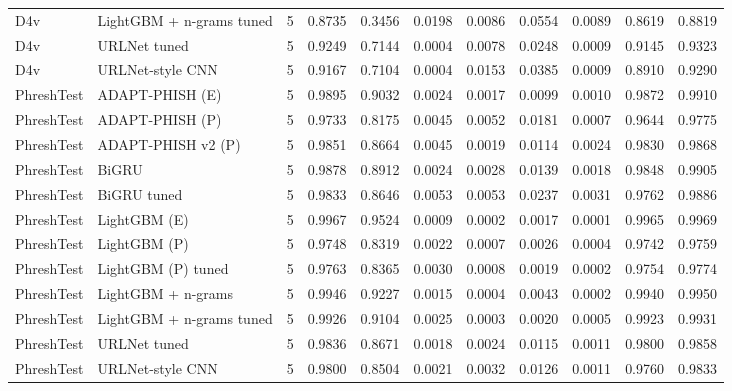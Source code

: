 \begin{table}[t]
\begin{tabular}{llrrrrrrrrr}
D4v & LightGBM + n-grams tuned & 5 & 0.8735 & 0.3456 & 0.0198 & 0.0086 & 0.0554 & 0.0089 & 0.8619 & 0.8819 \\
D4v & URLNet tuned & 5 & 0.9249 & 0.7144 & 0.0004 & 0.0078 & 0.0248 & 0.0009 & 0.9145 & 0.9323 \\
D4v & URLNet-style CNN & 5 & 0.9167 & 0.7104 & 0.0004 & 0.0153 & 0.0385 & 0.0009 & 0.8910 & 0.9290 \\
PhreshTest & ADAPT-PHISH (E) & 5 & 0.9895 & 0.9032 & 0.0024 & 0.0017 & 0.0099 & 0.0010 & 0.9872 & 0.9910 \\
PhreshTest & ADAPT-PHISH (P) & 5 & 0.9733 & 0.8175 & 0.0045 & 0.0052 & 0.0181 & 0.0007 & 0.9644 & 0.9775 \\
PhreshTest & ADAPT-PHISH v2 (P) & 5 & 0.9851 & 0.8664 & 0.0045 & 0.0019 & 0.0114 & 0.0024 & 0.9830 & 0.9868 \\
PhreshTest & BiGRU & 5 & 0.9878 & 0.8912 & 0.0024 & 0.0028 & 0.0139 & 0.0018 & 0.9848 & 0.9905 \\
PhreshTest & BiGRU tuned & 5 & 0.9833 & 0.8646 & 0.0053 & 0.0053 & 0.0237 & 0.0031 & 0.9762 & 0.9886 \\
PhreshTest & LightGBM (E) & 5 & 0.9967 & 0.9524 & 0.0009 & 0.0002 & 0.0017 & 0.0001 & 0.9965 & 0.9969 \\
PhreshTest & LightGBM (P) & 5 & 0.9748 & 0.8319 & 0.0022 & 0.0007 & 0.0026 & 0.0004 & 0.9742 & 0.9759 \\
PhreshTest & LightGBM (P) tuned & 5 & 0.9763 & 0.8365 & 0.0030 & 0.0008 & 0.0019 & 0.0002 & 0.9754 & 0.9774 \\
PhreshTest & LightGBM + n-grams & 5 & 0.9946 & 0.9227 & 0.0015 & 0.0004 & 0.0043 & 0.0002 & 0.9940 & 0.9950 \\
PhreshTest & LightGBM + n-grams tuned & 5 & 0.9926 & 0.9104 & 0.0025 & 0.0003 & 0.0020 & 0.0005 & 0.9923 & 0.9931 \\
PhreshTest & URLNet tuned & 5 & 0.9836 & 0.8671 & 0.0018 & 0.0024 & 0.0115 & 0.0011 & 0.9800 & 0.9858 \\
PhreshTest & URLNet-style CNN & 5 & 0.9800 & 0.8504 & 0.0021 & 0.0032 & 0.0126 & 0.0011 & 0.9760 & 0.9833 \\
\bottomrule
\end{tabular}
\end{table}